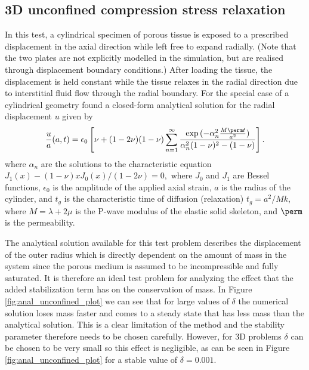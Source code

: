 
\subsection{3D unconfined compression stress relaxation}
\label{sec:unconfined}
In this test, a cylindrical specimen of porous tissue is exposed to a prescribed displacement in the axial direction while left free to expand radially. (Note that the two plates are not explicitly modelled in the simulation, but are realised through displacement boundary conditions.) After loading the tissue, the displacement is held constant while the tissue relaxes in the radial direction due to interstitial fluid flow through the radial boundary. For the special case of a cylindrical geometry \cite{armstrong1984analysis} found a closed-form analytical solution for the radial displacement $u$ given by
\begin{equation}
 \frac{u}{a}(a,t)=\epsilon_{0}\left[ \nu + (1-2\nu)(1-\nu) \sum^{\infty}_{n=1}\frac{\exp{( -\alpha_n^{2} \frac{M \perm t}{a^{2}}}) }{ \alpha_{n}^{2}(1-\nu)^{2}-(1-\nu) }  \right].
\end{equation}
where $\alpha_n$ are the solutions to the characteristic equation $J_{1}(x)-(1-\nu)xJ_{0}(x)/(1-2\nu)=0,$ where $J_{0}$ and $J_{1}$ are Bessel functions, $\epsilon_{0}$ is the amplitude of the applied axial strain, $a$ is the radius of the cylinder, and $t_{g}$ is the characteristic time of diffusion (relaxation) $t_{g}= a^{2}/M k$, where $M=\lambda + 2\mu$ is the P-wave modulus of the elastic solid skeleton, and $\perm$ is the permeability.


The analytical solution available for this test problem describes the displacement of the outer radius which is directly dependent on the amount of mass in the system since the porous medium is assumed to be incompressible and fully saturated. It is therefore an ideal test problem for analyzing the effect that the added stabilization term has on the conservation of mass. In Figure \ref{fig:anal_unconfined_plot} we can see that for large values of $\delta$ the numerical solution loses mass faster and comes to a steady state that has less mass than the analytical solution. This is a clear limitation of the method and the stability parameter therefore needs to be chosen carefully. However, for 3D problems $\delta$ can be chosen to be very small so this effect is negligible, as can be seen in Figure \ref{fig:anal_unconfined_plot} for a stable value of $\delta=0.001$.

